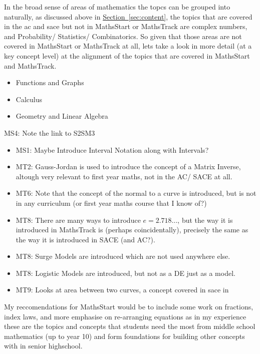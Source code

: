 \documentclass[twoside,12pt,a4paper]{report}
\newcommand{\refsec}[1]{\hyperref[sec:#1]{Section~\ref{sec:#1}}}
\begin{document}
In the broad sense of areas of mathematics the topcs can be grouped into naturally, as discussed above in \refsec{content}, the topics that are covered in the \gls{ac} and \gls{sace} but not in MathsStart or MathsTrack are complex numbers, and Probability/ Statistics/ Combinatorics. So given that those areas are not covered in MathsStart or MathsTrack at all, lets take a look in more detail (at a key concept level) at the alignment of the topics that are covered in MathsStart and MathsTrack.

\begin{itemize}
	\item Functions and Graphs
	\item Calculus
	\item Geometry and Linear Algebra
\end{itemize}





MS4: Note the link to S2SM3 

\begin{itemize}
	\item MS1: Maybe Introduce Interval Notation along with Intervals?
	\item MT2: Gauss-Jordan is used to introduce the concept of a Matrix Inverse, altough very relevant to first year maths, not in the AC/ SACE at all.
	\item MT6: Note that the concept of the normal to a curve is introduced, but is not in any curriculum (or first year maths course that I know of?)
	\item MT8: There are many ways to introduce $e = 2.718\hdots$, but the way it is introduced in MathsTrack is (perhaps coincidentally), precisely the same as the way it is introduced in SACE (and AC?).
	\item MT8: Surge Models are introduced which are not used anywhere else.
	\item MT8: Logistic Models are introduced, but not as a DE just as a model.
	\item MT9: Looks at area between two curves, a concept covered in \gls{sace} in 
\end{itemize}

My reccomendations for MathsStart would be to include some work on fractions, index laws, and more emphasise on re-arranging equations  as in my experience these are the topics and concepts that students need the most from middle school mathematics (up to year 10) and form foundations for building other concepts with in senior highschool. 
\end{document}
